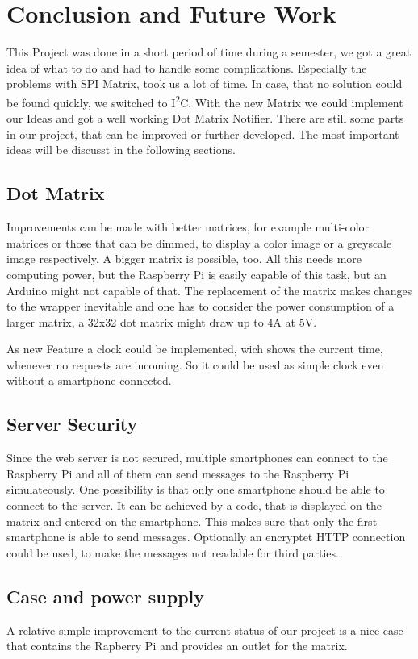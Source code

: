 \documentclass[conference]{IEEEtran}
\begin{document}
\section{Conclusion and Future Work}
This Project was done in a short period of time during a semester, we got a great idea of what to do and had to handle some complications. Especially the problems with SPI Matrix, took us a lot of time. In case, that no solution could be found quickly, we switched to I\textsuperscript{2}C. With the new Matrix we could implement our Ideas and got a well working Dot Matrix Notifier.
There are still some parts in our project, that can be improved or further developed. The most important ideas will be discusst in the following sections.

\subsection{Dot Matrix}
Improvements can be made with better matrices, for example multi-color matrices or those that can be dimmed, to display a color image or a greyscale image respectively. A bigger matrix is possible, too. All this needs more computing power, but the Raspberry Pi is easily capable of this task, but an Arduino might not capable of that. The replacement of the matrix makes changes to the wrapper inevitable and one has to consider the power consumption of a larger matrix, a 32x32 dot matrix might draw up to 4A at 5V.

As new Feature a clock could be implemented, wich shows the current time, whenever no requests are incoming. So it could be used as simple clock even without a smartphone connected.

\subsection{Server Security}
Since the web server is not secured, multiple smartphones can connect to the Raspberry Pi and all of them can send messages to the Raspberry Pi simulateously. One possibility is that only one smartphone should be able to connect to the server. It can be achieved by a code, that is displayed on the matrix and entered on the smartphone. This makes sure that only the first smartphone is able to send messages. Optionally an encryptet HTTP connection could be used, to make the messages not readable for third parties.

\subsection{Case and power supply}
A relative simple improvement to the current status of our project is a nice case that contains the Rapberry Pi and provides an outlet for the matrix.
\end{document}
